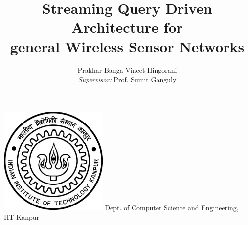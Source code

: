\begin{titlepage}

\title{Streaming Query Driven Architecture for \\general Wireless Sensor Networks}
\author{Prakhar Banga \qquad Vineet Hingorani\\\emph{Supervisor:} Prof. Sumit Ganguly}


\maketitle
\date{}

\vfill
\begin{center}
\includegraphics[width=0.40\textwidth]{./IIT_Kanpur_Logo.jpg}
\vfill
\LARGE{Dept. of Computer Science and Engineering, \\IIT Kanpur}

\end{center}
\end{titlepage}
